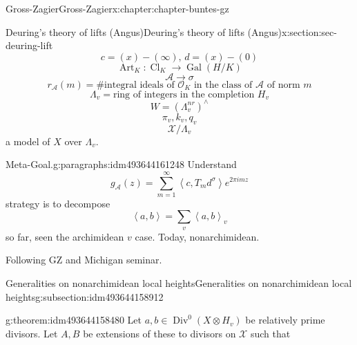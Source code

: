 \documentclass[oneside,10pt,]{book}
\numberwithin{equation}{section}
\newcommand{\pair}[2]{\left\langle #1, #2 \right\rangle}
\newcommand{\ints}{\mathcal{O}}
\DeclareMathOperator{\Div}{Div}
\DeclareMathOperator{\Cl}{Cl}
\newcommand{\Gal}[2]{\operatorname{Gal}(#1/#2)}
\begin{document}
\begin{chapterptx}{Gross-Zagier}{}{Gross-Zagier}{}{}{x:chapter:chapter-buntes-gz}
\begin{sectionptx}{Deuring's theory of lifts (Angus)}{}{Deuring's theory of lifts (Angus)}{}{}{x:section:sec-deuring-lift}
\begin{equation*}
c = (x) - (\infty ),\, d = (x) - (0)
\end{equation*}
%
\begin{equation*}
\operatorname{Art}_K \colon \Cl_K \to \Gal H K
\end{equation*}
%
\begin{equation*}
\mathscr A \to \sigma 
\end{equation*}
%
\begin{equation*}
r_{\mathscr A}(m) = \# \text{integral ideals of }\ints_K\text{ in the class of }\mathscr A \text{ of norm }m
\end{equation*}
%
\begin{equation*}
\Lambda _v = \text{ring of integers in the completion }H_v
\end{equation*}
%
\begin{equation*}
W = (\Lambda _v^{nr})^\wedge
\end{equation*}
%
\begin{equation*}
\pi _v, k_v, q_v
\end{equation*}
%
\begin{equation*}
\mathcal X/\Lambda _v
\end{equation*}
a model of \(X\) over \(\Lambda _v\).%
\begin{paragraphs}{Meta-Goal.}{g:paragraphs:idm493644161248}%
Understand%
\begin{equation*}
g_{\mathscr A}(z) = \sum_{m=1}^\infty \pair c {T_m d^\sigma } e^{2\pi  i m z}
\end{equation*}
strategy is to decompose%
\begin{equation*}
\pair a b = \sum_v \pair ab_v
\end{equation*}
so far, seen the archimidean \(v\) case. Today, nonarchimidean.%
\par
Following GZ and Michigan seminar.%
\end{paragraphs}%
%
%
\typeout{************************************************}
\typeout{************************************************}
%
\begin{subsectionptx}{Generalities on nonarchimidean local heights}{}{Generalities on nonarchimidean local heights}{}{}{g:subsection:idm493644158912}
\begin{theorem}{}{}{g:theorem:idm493644158480}%
Let \(a,b\in \Div^0(X \otimes H_v)\) be relatively prime divisors. Let \(A,B\) be extensions of these to divisors on \(\mathcal X\) such that%
\begin{equation*}

\end{equation*}
\end{theorem}
\end{subsectionptx}
\end{sectionptx}
\end{chapterptx}
\end{document}
